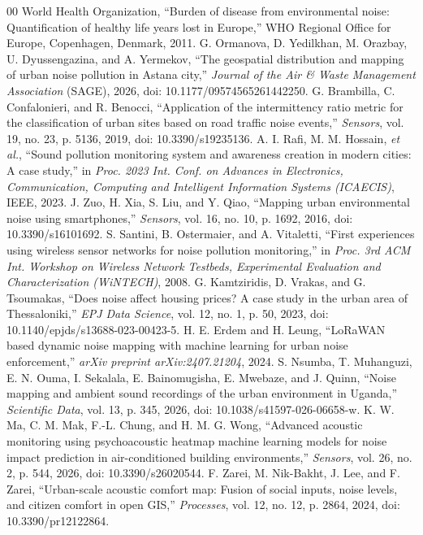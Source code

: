 \documentclass[conference]{IEEEtran}
\begin{document}
\begin{thebibliography}{00}
 World Health Organization, ``Burden of disease from environmental noise: Quantification of healthy life years lost in Europe,'' WHO Regional Office for Europe, Copenhagen, Denmark, 2011.
 G. Ormanova, D. Yedilkhan, M. Orazbay, U. Dyussengazina, and A. Yermekov, ``The geospatial distribution and mapping of urban noise pollution in Astana city,'' \textit{Journal of the Air \& Waste Management Association} (SAGE), 2026, doi: 10.1177/09574565261442250.
 G. Brambilla, C. Confalonieri, and R. Benocci, ``Application of the intermittency ratio metric for the classification of urban sites based on road traffic noise events,'' \textit{Sensors}, vol. 19, no. 23, p. 5136, 2019, doi: 10.3390/s19235136.
 A. I. Rafi, M. M. Hossain, \textit{et al.}, ``Sound pollution monitoring system and awareness creation in modern cities: A case study,'' in \textit{Proc. 2023 Int. Conf. on Advances in Electronics, Communication, Computing and Intelligent Information Systems (ICAECIS)}, IEEE, 2023.
 J. Zuo, H. Xia, S. Liu, and Y. Qiao, ``Mapping urban environmental noise using smartphones,'' \textit{Sensors}, vol. 16, no. 10, p. 1692, 2016, doi: 10.3390/s16101692.
 S. Santini, B. Ostermaier, and A. Vitaletti, ``First experiences using wireless sensor networks for noise pollution monitoring,'' in \textit{Proc. 3rd ACM Int. Workshop on Wireless Network Testbeds, Experimental Evaluation and Characterization (WiNTECH)}, 2008.
 G. Kamtziridis, D. Vrakas, and G. Tsoumakas, ``Does noise affect housing prices? A case study in the urban area of Thessaloniki,'' \textit{EPJ Data Science}, vol. 12, no. 1, p. 50, 2023, doi: 10.1140/epjds/s13688-023-00423-5.
 H. E. Erdem and H. Leung, ``LoRaWAN based dynamic noise mapping with machine learning for urban noise enforcement,'' \textit{arXiv preprint arXiv:2407.21204}, 2024.
 S. Nsumba, T. Muhanguzi, E. N. Ouma, I. Sekalala, E. Bainomugisha, E. Mwebaze, and J. Quinn, ``Noise mapping and ambient sound recordings of the urban environment in Uganda,'' \textit{Scientific Data}, vol. 13, p. 345, 2026, doi: 10.1038/s41597-026-06658-w.
 K. W. Ma, C. M. Mak, F.-L. Chung, and H. M. G. Wong, ``Advanced acoustic monitoring using psychoacoustic heatmap machine learning models for noise impact prediction in air-conditioned building environments,'' \textit{Sensors}, vol. 26, no. 2, p. 544, 2026, doi: 10.3390/s26020544.
 F. Zarei, M. Nik-Bakht, J. Lee, and F. Zarei, ``Urban-scale acoustic comfort map: Fusion of social inputs, noise levels, and citizen comfort in open GIS,'' \textit{Processes}, vol. 12, no. 12, p. 2864, 2024, doi: 10.3390/pr12122864.
\end{thebibliography}
\end{document}
